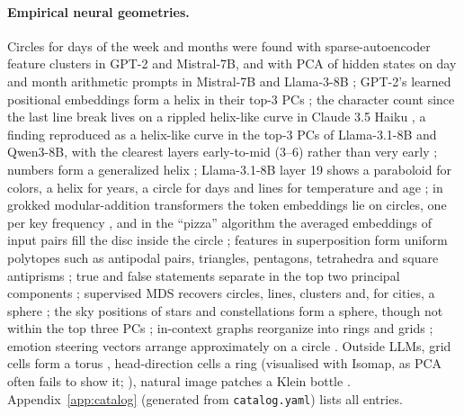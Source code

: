 \documentclass[10pt]{article}
\begin{document}
\paragraph{Empirical neural geometries.} Circles for days of the week and months were found with sparse-autoencoder feature clusters in GPT-2 and Mistral-7B, and with PCA of hidden states on day and month arithmetic prompts in Mistral-7B and Llama-3-8B \citep{engels2025notall}; GPT-2's learned positional embeddings form a helix in their top-3 PCs \citep{yedidia2023helix}; the character count since the last line break lives on a rippled helix-like curve in Claude 3.5 Haiku \citep{gurnee2025linebreaks}, a finding reproduced as a helix-like curve in the top-3 PCs of Llama-3.1-8B and Qwen3-8B, with the clearest layers early-to-mid (3--6) rather than very early \citep{sinii2026counting}; numbers form a generalized helix \citep{kantamneni2025trig}; Llama-3.1-8B layer 19 shows a paraboloid for colors, a helix for years, a circle for days and lines for temperature and age \citep{bhalla2026sae}; in grokked modular-addition transformers the token embeddings lie on circles, one per key frequency \citep{nanda2023progress,zhong2023clock}, and in the ``pizza'' algorithm the averaged embeddings of input pairs fill the disc inside the circle \citep{zhong2023clock}; features in superposition form uniform polytopes such as antipodal pairs, triangles, pentagons, tetrahedra and square antiprisms \citep{elhage2022tms}; true and false statements separate in the top two principal components \citep{marks2024truth}; supervised MDS recovers circles, lines, clusters and, for cities, a sphere \citep{tiblias2025smds}; the sky positions of stars and constellations form a sphere, though not within the top three PCs \citep{berdnikov2026sky}; in-context graphs reorganize into rings and grids \citep{park2025iclr}; emotion steering vectors arrange approximately on a circle \citep{sun2026valence}. Outside LLMs, grid cells form a torus \citep{gardner2022torus}, head-direction cells a ring (visualised with Isomap, as PCA often fails to show it; \citealp{chaudhuri2019ring}), natural image patches a Klein bottle \citep{carlsson2008klein}. Appendix~\ref{app:catalog} (generated from \texttt{catalog.yaml}) lists all entries.
\end{document}
